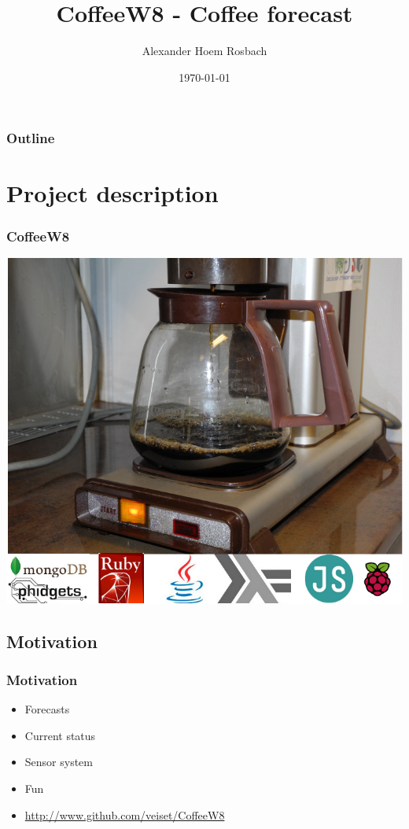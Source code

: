 \documentclass{beamer}
\title{CoffeeW8 - Coffee forecast}
\author{Alexander Hoem Rosbach}
\date{\today}
\institute[2012]{Master student, UiB/BLDL}
\begin{document}
\frame{\titlepage}
\logo{}

\begin{frame}
    \frametitle{Outline}
    \tableofcontents
\end{frame}

\section{Project description}
\begin{frame}
    \frametitle{CoffeeW8}
    \centerline{\includegraphics[scale=1.5]{images/project.png}}
\end{frame}
\subsection{Motivation}
\begin{frame}
    \frametitle{Motivation}
    \begin{itemize}
        \item Forecasts
        \item Current status
        \item Sensor system
        \item Fun
        \item \url{http://www.github.com/veiset/CoffeeW8}
    \end{itemize}
\end{frame}
\end{document}
